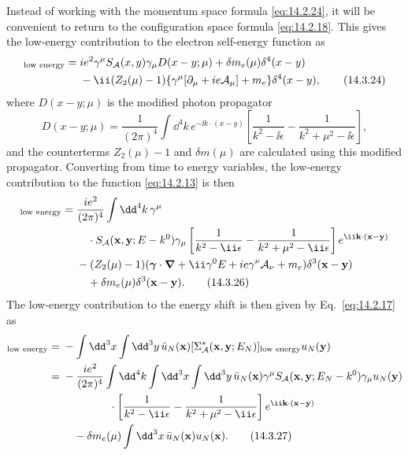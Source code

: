 Instead of working with the momentum space formula \eqref{eq:14.2.24}, it will
be convenient to return to the configuration space formula
\eqref{eq:14.2.18}. This gives the low-energy contribution to the electron
self-energy function as
\begin{align}
[\Sigma_{\mathcal A}^*(x,y)]_{\text{low energy}}
={}&ie^2\gamma^\mu S_{\mathcal A}(x,y)\gamma_\mu D(x-y;\mu)
+\delta m_e(\mu)\delta^4(x-y)\notag\\
&-\ii(Z_2(\mu)-1)\{\gamma^\mu[\partial_\mu+ie\mathcal A_\mu]+m_e\}
\delta^4(x-y),
\tag{14.3.24}\label{eq:14.3.24}
\end{align}
where $D(x-y;\mu)$ is the modified photon propagator
\begin{equation}
D(x-y;\mu)=\frac{1}{(2\pi)^4}\int \dd^4k\,e^{-\ii k\cdot(x-y)}
\left[\frac{1}{k^2-\ii\epsilon}-\frac{1}{k^2+\mu^2-\ii\epsilon}\right],
\tag{14.3.25}\label{eq:14.3.25}
\end{equation}
and the counterterms $Z_2(\mu)-1$ and $\delta m(\mu)$ are calculated using this
modified propagator. Converting from time to energy variables, the low-energy
contribution to the function \eqref{eq:14.2.13} is then
\begin{align}
[\Sigma_{\mathcal A}^*(\mathbf x,\mathbf y;E)]_{\text{low energy}}
={}&\frac{ie^2}{(2\pi)^4}\int \dd^4k\,\gamma^\mu
\notag\\
&\quad\cdot S_{\mathcal A}(\mathbf x,\mathbf y;E-k^0)\gamma_\mu
\left[\frac{1}{k^2-\ii\epsilon}-\frac{1}{k^2+\mu^2-\ii\epsilon}\right]
e^{\ii\mathbf k\cdot(\mathbf x-\mathbf y)}\notag\\
&-(Z_2(\mu)-1)(\boldsymbol\gamma\cdot\boldsymbol\nabla
+\ii\gamma^0E+ie\gamma^\nu\mathcal A_\nu+m_e)
\delta^3(\mathbf x-\mathbf y)\notag\\
&\quad+\delta m_e(\mu)\delta^3(\mathbf x-\mathbf y).
\tag{14.3.26}\label{eq:14.3.26}
\end{align}
The low-energy contribution to the energy shift is then given by
Eq.~\eqref{eq:14.2.17} as
\begin{align}
[\delta E_N]_{\text{low energy}}
={}&-\int \dd^3x\int \dd^3y\,\bar u_N(\mathbf x)
[\Sigma_{\mathcal A}^*(\mathbf x,\mathbf y;E_N)]_{\text{low energy}}
u_N(\mathbf y)\notag\\
={}&-\frac{ie^2}{(2\pi)^4}\int \dd^4k\int \dd^3x\int \dd^3y\,
\bar u_N(\mathbf x)\gamma^\mu
S_{\mathcal A}(\mathbf x,\mathbf y;E_N-k^0)\gamma_\mu u_N(\mathbf y)
\notag\\
&\hspace{15mm}\cdot
\left[\frac{1}{k^2-\ii\epsilon}-\frac{1}{k^2+\mu^2-\ii\epsilon}\right]
e^{\ii\mathbf k\cdot(\mathbf x-\mathbf y)}\notag\\
&\quad-\delta m_e(\mu)\int \dd^3x\,\bar u_N(\mathbf x)u_N(\mathbf x).
\tag{14.3.27}\label{eq:14.3.27}
\end{align}
